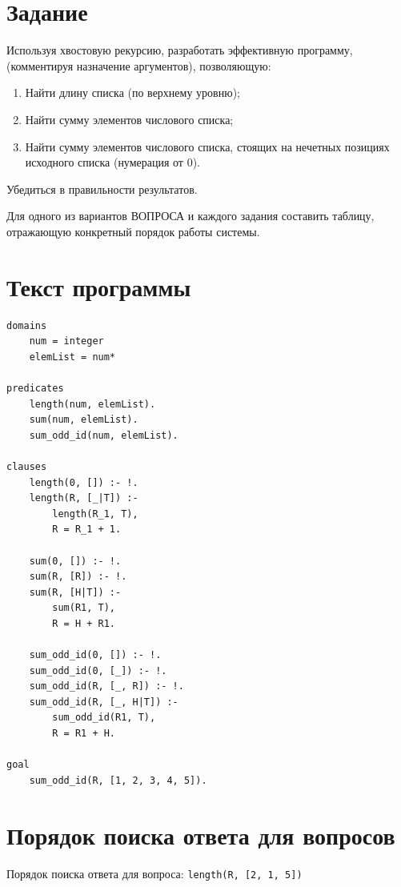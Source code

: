 {\large\section*{Задание}}

Используя хвостовую рекурсию, разработать эффективную программу, (комментируя назначение аргументов), позволяющую:

\begin{enumerate}[1.]
	\item Найти длину списка (по верхнему уровню);
	\item Найти сумму элементов числового списка;
	\item Найти сумму элементов числового списка, стоящих на нечетных позициях исходного списка (нумерация от 0).
\end{enumerate}

Убедиться в правильности результатов.

Для одного из вариантов ВОПРОСА и каждого задания составить таблицу, отражающую конкретный порядок работы системы.

\clearpage

{\large\section*{Текст программы}}

\begin{lstlisting}
domains
	num = integer
	elemList = num*

predicates
	length(num, elemList).
	sum(num, elemList).
	sum_odd_id(num, elemList).

clauses
	length(0, []) :- !.
	length(R, [_|T]) :-
		length(R_1, T),
		R = R_1 + 1.
	
	sum(0, []) :- !.
	sum(R, [R]) :- !.
	sum(R, [H|T]) :-
		sum(R1, T),
		R = H + R1.
	
	sum_odd_id(0, []) :- !.
	sum_odd_id(0, [_]) :- !.
	sum_odd_id(R, [_, R]) :- !.
	sum_odd_id(R, [_, H|T]) :-
		sum_odd_id(R1, T),
		R = R1 + H.

goal
	sum_odd_id(R, [1, 2, 3, 4, 5]).
\end{lstlisting}

\clearpage

{\large\section*{Порядок поиска ответа для вопросов}}

Порядок поиска ответа для вопроса: \texttt{length(R, [2, 1, 5])}

